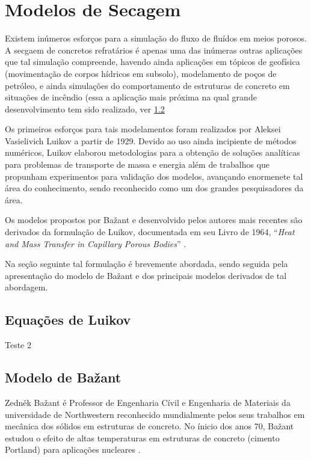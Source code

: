 \section{Modelos de Secagem}\label{modelos}
Existem inúmeros esforços para a simulação do fluxo de fluídos em meios porosos.
A secgaem de concretos refratários é apenas uma das inúmeras outras aplicações
que tal simulação compreende, havendo ainda aplicações em tópicos de geofísica
(movimentação de corpos hídricos em subsolo), modelamento de poços de petróleo,
e ainda simulações do comportamento de estruturas de concreto em situações de
incêndio (essa a aplicação mais próxima na qual grande desenvolvimento tem sido
realizado, ver \ref{sec:bazant}


Os primeiros esforços para tais modelamentos foram realizados por Aleksei Vasielivich Luikov
\cite{martynenko2010} a partir de 1929. Devido ao uso ainda incipiente de
métodos numéricos, Luikov elaborou metodologias para a obtenção de soluções
analíticas para problemas de transporte de massa e energia além de trabalhos que
propunham experimentos para validação dos modelos, avançando enormenete tal área
do conhecimento, sendo reconhecido como um dos grandes pesquisadores da área.

Os modelos propostos por Ba\v{z}ant e desenvolvido pelos autores mais recentes são
derivados da formulação de Luikov, documentada em seu Livro de 1964, ``\textit{Heat and
Mass Transfer in Capillary Porous Bodies}''
\cite{luikov1964heat}.

Na seção seguinte tal formulação é brevemente abordada, sendo seguida pela
apresentação do modelo de Ba\v{z}ant e dos principais modelos derivados de tal abordagem.



    \subsection{Equações de Luikov}
    Teste 2 
    
    \subsection{Modelo de Ba\v{z}ant}\label{sec:bazant}
    Zedn\v{e}k Ba\v{z}ant é Professor de Engenharia Cívil e Engenharia de
    Materiais da universidade de Northwestern reconhecido mundialmente pelos
    seus trabalhos em  mecânica dos sólidos em estruturas de concreto. No ínicio
    dos anos 70, Ba\v{z}ant estudou o efeito de altas temperaturas em estruturas
    de concreto (cimento Portland) para aplicações nucleares \cite{bundesen2004biography}.
    
